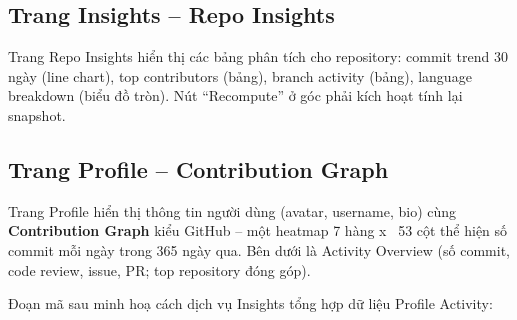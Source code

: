 
\subsection{Trang Insights -- Repo Insights}
Trang Repo Insights hiển thị các bảng phân tích cho repository: commit trend 30 ngày (line chart), top contributors (bảng), branch activity (bảng), language breakdown (biểu đồ tròn). Nút ``Recompute'' ở góc phải kích hoạt tính lại snapshot.


\subsection{Trang Profile -- Contribution Graph}
Trang Profile hiển thị thông tin người dùng (avatar, username, bio) cùng \textbf{Contribution Graph} kiểu GitHub -- một heatmap 7 hàng x ~53 cột thể hiện số commit mỗi ngày trong 365 ngày qua. Bên dưới là Activity Overview (số commit, code review, issue, PR; top repository đóng góp).


Đoạn mã sau minh hoạ cách dịch vụ Insights tổng hợp dữ liệu Profile Activity:

